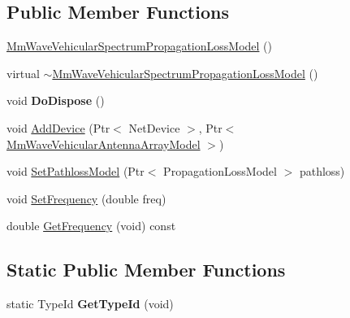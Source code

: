 \subsection*{Public Member Functions}
\begin{DoxyCompactItemize}
\item 
\hyperlink{classns3_1_1millicar_1_1MmWaveVehicularSpectrumPropagationLossModel_a9cb94e871be75a415ffd92015793a535}{Mm\+Wave\+Vehicular\+Spectrum\+Propagation\+Loss\+Model} ()
\item 
virtual \hyperlink{classns3_1_1millicar_1_1MmWaveVehicularSpectrumPropagationLossModel_aaa3809b4d4d0731f2206b71a0d5d9d9c}{$\sim$\+Mm\+Wave\+Vehicular\+Spectrum\+Propagation\+Loss\+Model} ()
\item 
\mbox{\label{classns3_1_1millicar_1_1MmWaveVehicularSpectrumPropagationLossModel_a31388e68c063456d30daf210783b5f62}} 
void {\bfseries Do\+Dispose} ()
\item 
void \hyperlink{classns3_1_1millicar_1_1MmWaveVehicularSpectrumPropagationLossModel_ab2c520f59106e0e7a919d6c724a8dd96}{Add\+Device} (Ptr$<$ Net\+Device $>$, Ptr$<$ \hyperlink{classns3_1_1millicar_1_1MmWaveVehicularAntennaArrayModel}{Mm\+Wave\+Vehicular\+Antenna\+Array\+Model} $>$)
\item 
void \hyperlink{classns3_1_1millicar_1_1MmWaveVehicularSpectrumPropagationLossModel_a87bc2bb292dc183649be9046062f3648}{Set\+Pathloss\+Model} (Ptr$<$ Propagation\+Loss\+Model $>$ pathloss)
\item 
void \hyperlink{classns3_1_1millicar_1_1MmWaveVehicularSpectrumPropagationLossModel_a0f59e8c2b0fa28ae37e2f239b6abaa1b}{Set\+Frequency} (double freq)
\item 
double \hyperlink{classns3_1_1millicar_1_1MmWaveVehicularSpectrumPropagationLossModel_ad9fb12c1bb96aa3bbd3eb676cdfa855f}{Get\+Frequency} (void) const
\end{DoxyCompactItemize}
\subsection*{Static Public Member Functions}
\begin{DoxyCompactItemize}
\item 
\mbox{\label{classns3_1_1millicar_1_1MmWaveVehicularSpectrumPropagationLossModel_ae0e9dd0e9bf2c545e5673b18275b9321}} 
static Type\+Id {\bfseries Get\+Type\+Id} (void)
\end{DoxyCompactItemize}


